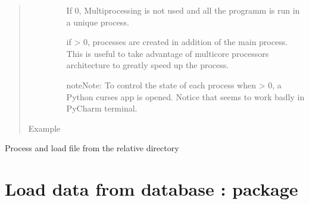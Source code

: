 \documentclass[letterpaper,10pt,english]{sphinxmanual}
\begin{document}
\begin{fulllineitems}
\begin{quote}
\begin{description}
\begin{itemize}
If 0, Multiprocessing is not used and all the programm is run in a unique process.

if  \textgreater{} 0,  processes are created in addition of the main process. This is useful to take
advantage of multicore processors architecture to greatly speed up the process.

\begin{sphinxadmonition}{note}{Note:}
To control the state of each process when  \textgreater{} 0, a Python curses app is opened. Notice that
seems to work badly in PyCharm terminal.
\end{sphinxadmonition}


\end{itemize}

\item[{Example}] \leavevmode
\end{description}\end{quote}

Process and load file from the relative directory 

%
\begin{sphinxVerbatim}[commandchars=\\\{\}]
  \PYG{p}{[}\PYG{p}{]}
      
       
         

\end{sphinxVerbatim}

\end{fulllineitems}



\chapter{Load data from database :  package}
\label{\detokenize{load:load-data-from-database-load-package}}\label{\detokenize{load::doc}}
\end{document}

